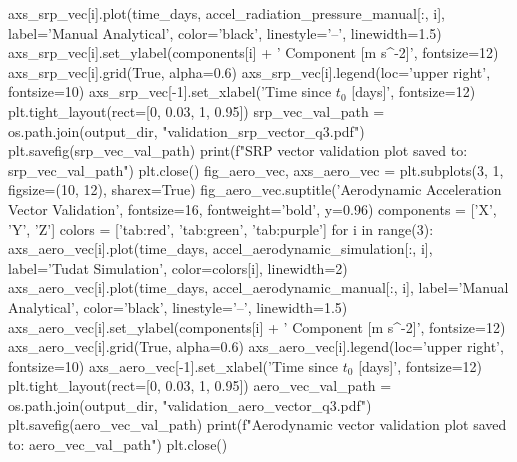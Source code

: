 {}
\markdownRendererSectionEnd \markdownRendererSectionBegin
{}\markdownRendererInterblockSeparator
{}axs_srp_vec[i].plot(time_days, accel_radiation_pressure_manual[:, i], label='Manual Analytical', color='black', linestyle='--', linewidth=1.5) axs_srp_vec[i].set_ylabel(components[i] + ' Component [m s^-2]', fontsize=12) axs_srp_vec[i].grid(True, alpha=0.6) axs_srp_vec[i].legend(loc='upper right', fontsize=10) axs_srp_vec[-1].set_xlabel('Time since $t_0$ [days]', fontsize=12) plt.tight_layout(rect=[0, 0.03, 1, 0.95]) srp_vec_val_path = os.path.join(output_dir, "validation_srp_vector_q3.pdf") plt.savefig(srp_vec_val_path) print(f"SRP vector validation plot saved to: {srp_vec_val_path}") plt.close()\markdownRendererInterblockSeparator
{}
\markdownRendererSectionEnd \markdownRendererSectionBegin
\markdownRendererHeadingOne{-------------------------------------------------------------------------}\markdownRendererInterblockSeparator
{}
\markdownRendererSectionEnd \markdownRendererSectionBegin
{}\markdownRendererInterblockSeparator
{}
\markdownRendererSectionEnd \markdownRendererSectionBegin
\markdownRendererHeadingOne{-------------------------------------------------------------------------}\markdownRendererInterblockSeparator
{}fig_aero_vec, axs_aero_vec = plt.subplots(3, 1, figsize=(10, 12), sharex=True) fig_aero_vec.suptitle('Aerodynamic Acceleration Vector Validation', fontsize=16, fontweight='bold', y=0.96) components = ['X', 'Y', 'Z'] colors = ['tab:red', 'tab:green', 'tab:purple'] for i in range(3):\markdownRendererInterblockSeparator
{}
\markdownRendererSectionEnd \markdownRendererSectionBegin
{}\markdownRendererInterblockSeparator
{}axs_aero_vec[i].plot(time_days, accel_aerodynamic_simulation[:, i], label='Tudat Simulation', color=colors[i], linewidth=2)\markdownRendererInterblockSeparator
{}
\markdownRendererSectionEnd \markdownRendererSectionBegin
{}\markdownRendererInterblockSeparator
{}axs_aero_vec[i].plot(time_days, accel_aerodynamic_manual[:, i], label='Manual Analytical', color='black', linestyle='--', linewidth=1.5) axs_aero_vec[i].set_ylabel(components[i] + ' Component [m s^-2]', fontsize=12) axs_aero_vec[i].grid(True, alpha=0.6) axs_aero_vec[i].legend(loc='upper right', fontsize=10) axs_aero_vec[-1].set_xlabel('Time since $t_0$ [days]', fontsize=12) plt.tight_layout(rect=[0, 0.03, 1, 0.95]) aero_vec_val_path = os.path.join(output_dir, "validation_aero_vector_q3.pdf") plt.savefig(aero_vec_val_path) print(f"Aerodynamic vector validation plot saved to: {aero_vec_val_path}") plt.close()\markdownRendererInterblockSeparator

